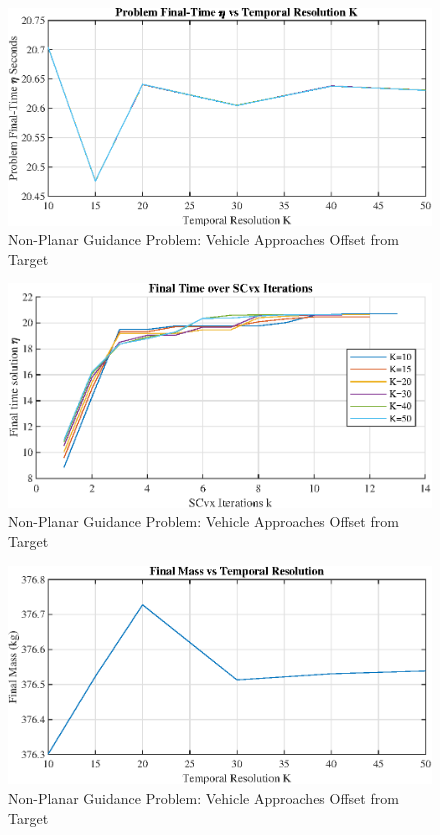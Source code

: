 \begin{figure}[!htbp] 
\label{}
  \centering
  \includegraphics[width=\textwidth]{figs/etavsK.eps}
  \caption{Non-Planar Guidance Problem: Vehicle Approaches Offset from Target}
  \label{fig:nplanarcontrols}
\end{figure}
\begin{figure}[!htbp] 
\label{}
  \centering
  \includegraphics[width=\textwidth]{figs/iteratetiming.eps}
  \caption{Non-Planar Guidance Problem: Vehicle Approaches Offset from Target}
  \label{fig:nplanarcontrols}
\end{figure}
\begin{figure}[!htbp] 
\label{}
  \centering
  \includegraphics[width=\textwidth]{figs/massvsK.eps}
  \caption{Non-Planar Guidance Problem: Vehicle Approaches Offset from Target}
  \label{fig:nplanarcontrols}
\end{figure}

